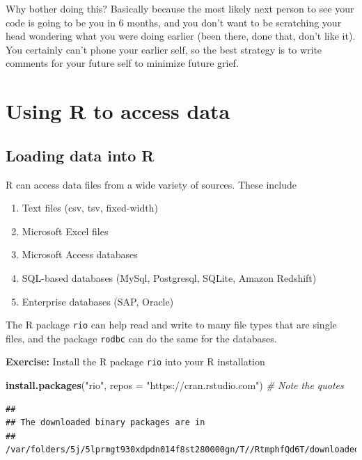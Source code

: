 \documentclass[12pt,letterpaperpaper,openany]{book}
\newenvironment{Shaded}{\begin{snugshade}}{\end{snugshade}}
\newcommand{\CommentTok}[1]{\textcolor[rgb]{0.56,0.35,0.01}{\textit{#1}}}
\newcommand{\DataTypeTok}[1]{\textcolor[rgb]{0.13,0.29,0.53}{#1}}
\newcommand{\KeywordTok}[1]{\textcolor[rgb]{0.13,0.29,0.53}{\textbf{#1}}}
\newcommand{\NormalTok}[1]{#1}
\newcommand{\StringTok}[1]{\textcolor[rgb]{0.31,0.60,0.02}{#1}}
\providecommand{\tightlist}{%
  \setlength{\itemsep}{0pt}\setlength{\parskip}{0pt}}
\begin{document}
Why bother doing this? Basically because the most likely next person to see your code is going to be you in 6 months, and you don't want to be scratching your head wondering what you were doing earlier (been there, done that, don't like it). You certainly can't phone your earlier self, so the best strategy is to write comments for your future self to minimize future grief.

\hypertarget{part-using-r-to-access-data}{%
\part*{Using R to access data}\label{part-using-r-to-access-data}}

\hypertarget{loading-data-into-r}{%
\chapter{Loading data into R}\label{loading-data-into-r}}

R can access data files from a wide variety of sources. These include

\begin{enumerate}
\def\labelenumi{\arabic{enumi}.}
\tightlist
\item
  Text files (csv, tsv, fixed-width)
\item
  Microsoft Excel files
\item
  Microsoft Access databases
\item
  SQL-based databases (MySql, Postgresql, SQLite, Amazon Redshift)
\item
  Enterprise databases (SAP, Oracle)
\end{enumerate}

The R package \texttt{rio} can help read and write to many file types that are single files,
and the package \texttt{rodbc} can do the same for the databases.

 \textbf{Exercise:} Install the R package \texttt{rio} into your R installation

\begin{Shaded}
\begin{Highlighting}[]
\KeywordTok{install.packages}\NormalTok{(}\StringTok{"rio"}\NormalTok{, }\DataTypeTok{repos =} \StringTok{"https://cran.rstudio.com"}\NormalTok{) }\CommentTok{# Note the quotes}
\end{Highlighting}
\end{Shaded}

\begin{verbatim}
## 
## The downloaded binary packages are in
##  /var/folders/5j/5lprmgt930xdpdn014f8st280000gn/T//RtmphfQd6T/downloaded_packages
\end{verbatim}
\end{document}
